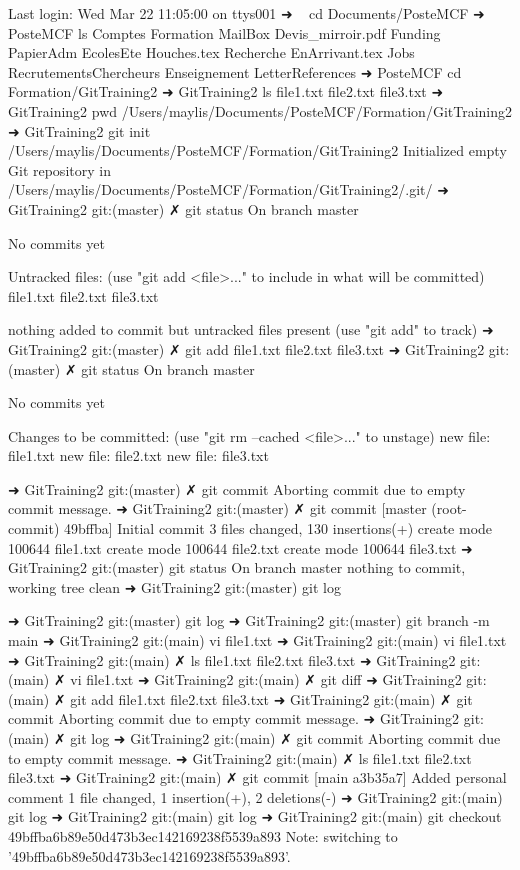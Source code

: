Last login: Wed Mar 22 11:05:00 on ttys001
➜  ~ cd Documents/PosteMCF 
➜  PosteMCF ls
Comptes                Formation              MailBox
Devis_mirroir.pdf      Funding                PapierAdm
EcolesEte              Houches.tex            Recherche
EnArrivant.tex         Jobs                   RecrutementsChercheurs
Enseignement           LetterReferences
➜  PosteMCF cd Formation/GitTraining2 
➜  GitTraining2 ls
file1.txt file2.txt file3.txt
➜  GitTraining2 pwd
/Users/maylis/Documents/PosteMCF/Formation/GitTraining2
➜  GitTraining2 git init /Users/maylis/Documents/PosteMCF/Formation/GitTraining2 
Initialized empty Git repository in /Users/maylis/Documents/PosteMCF/Formation/GitTraining2/.git/
➜  GitTraining2 git:(master) ✗ git status
On branch master

No commits yet

Untracked files:
  (use "git add <file>..." to include in what will be committed)
	file1.txt
	file2.txt
	file3.txt

nothing added to commit but untracked files present (use "git add" to track)
➜  GitTraining2 git:(master) ✗ git add file1.txt file2.txt file3.txt
➜  GitTraining2 git:(master) ✗ git status
On branch master

No commits yet

Changes to be committed:
  (use "git rm --cached <file>..." to unstage)
	new file:   file1.txt
	new file:   file2.txt
	new file:   file3.txt

➜  GitTraining2 git:(master) ✗ git commit                           
Aborting commit due to empty commit message.
➜  GitTraining2 git:(master) ✗ git commit
[master (root-commit) 49bffba] Initial commit
 3 files changed, 130 insertions(+)
 create mode 100644 file1.txt
 create mode 100644 file2.txt
 create mode 100644 file3.txt
➜  GitTraining2 git:(master) git status
On branch master
nothing to commit, working tree clean
➜  GitTraining2 git:(master) git log

➜  GitTraining2 git:(master) git log
➜  GitTraining2 git:(master) git branch -m main             
➜  GitTraining2 git:(main) vi file1.txt 
➜  GitTraining2 git:(main) vi file1.txt
➜  GitTraining2 git:(main) ✗ ls
file1.txt file2.txt file3.txt
➜  GitTraining2 git:(main) ✗ vi file1.txt
➜  GitTraining2 git:(main) ✗ git diff    
➜  GitTraining2 git:(main) ✗ git add file1.txt file2.txt file3.txt
➜  GitTraining2 git:(main) ✗ git commit                           
Aborting commit due to empty commit message.
➜  GitTraining2 git:(main) ✗ git log
➜  GitTraining2 git:(main) ✗ git commit
Aborting commit due to empty commit message.
➜  GitTraining2 git:(main) ✗ ls
file1.txt file2.txt file3.txt
➜  GitTraining2 git:(main) ✗ git commit
[main a3b35a7] Added personal comment
 1 file changed, 1 insertion(+), 2 deletions(-)
➜  GitTraining2 git:(main) git log
➜  GitTraining2 git:(main) git log
➜  GitTraining2 git:(main) git checkout 49bffba6b89e50d473b3ec142169238f5539a893
Note: switching to '49bffba6b89e50d473b3ec142169238f5539a893'.

